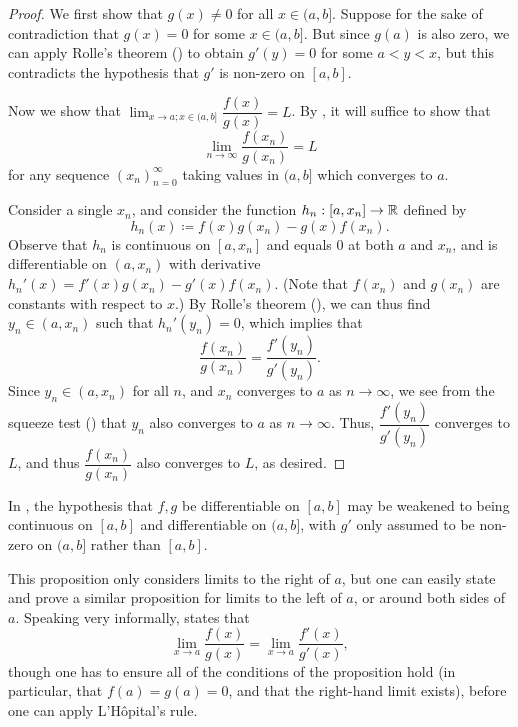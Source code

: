 \begin{proof}
  We first show that \(g(x) \neq 0\) for all \(x \in (a, b]\).
  Suppose for the sake of contradiction that \(g(x) = 0\) for some \(x \in (a, b]\).
  But since \(g(a)\) is also zero, we can apply Rolle's theorem () to obtain \(g'(y) = 0\) for some \(a < y < x\), but this contradicts the hypothesis that \(g'\) is non-zero on \([a, b]\).

  Now we show that \(\lim_{x \to a ; x \in (a, b]} \dfrac{f(x)}{g(x)} = L\).
  By , it will suffice to show that
  \[
    \lim_{n \to \infty} \dfrac{f(x_n)}{g(x_n)} = L
  \]
  for any sequence \((x_n)_{n = 0}^\infty\) taking values in \((a, b]\) which converges to \(a\).

  Consider a single \(x_n\), and consider the function \(h_n : [a, x_n] \to \mathbb{R}\) defined by
  \[
    h_n(x) \coloneqq f(x) g(x_n) - g(x) f(x_n).
  \]
  Observe that \(h_n\) is continuous on \([a, x_n]\) and equals \(0\) at both \(a\) and \(x_n\), and is differentiable on \((a, x_n)\) with derivative \(h_n'(x) = f'(x) g(x_n) - g'(x) f(x_n)\).
  (Note that \(f(x_n)\) and \(g(x_n)\) are constants with respect to \(x\).)
  By Rolle's theorem (), we can thus find \(y_n \in (a, x_n)\) such that \(h_n'(y_n) = 0\), which implies that
  \[
    \dfrac{f(x_n)}{g(x_n)} = \dfrac{f'(y_n)}{g'(y_n)}.
  \]
  Since \(y_n \in (a, x_n)\) for all \(n\), and \(x_n\) converges to \(a\) as \(n \to \infty\), we see from the squeeze test () that \(y_n\) also converges to \(a\) as \(n \to \infty\).
  Thus, \(\dfrac{f'(y_n)}{g'(y_n)}\) converges to \(L\), and thus \(\dfrac{f(x_n)}{g(x_n)}\) also converges to \(L\), as desired.
\end{proof}

\begin{note}
  In , the hypothesis that \(f, g\) be differentiable on \([a, b]\) may be weakened to being continuous on \([a, b]\) and differentiable on \((a, b]\), with \(g'\) only assumed to be non-zero on \((a, b]\) rather than \([a, b]\).
\end{note}

\begin{rmk}\label{i:10.5.3}
  This proposition only considers limits to the right of \(a\), but one can easily state and prove a similar proposition for limits to the left of \(a\), or around both sides of \(a\).
  Speaking very informally,  states that
  \[
    \lim_{x \to a} \dfrac{f(x)}{g(x)} = \lim_{x \to a} \dfrac{f'(x)}{g'(x)},
  \]
  though one has to ensure all of the conditions of the proposition hold (in particular, that \(f(a) = g(a) = 0\), and that the right-hand limit exists), before one can apply L'Hôpital's rule.
\end{rmk}


